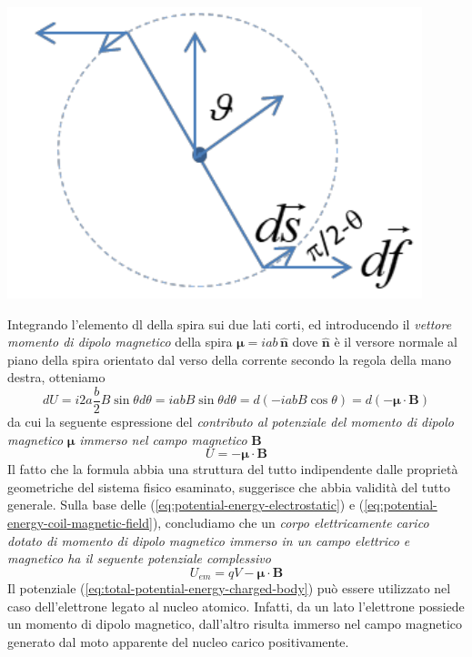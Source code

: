 \begin{marginfigure}
	\includegraphics{figs/rectangular-coil-angle}
	\label{fig:rectangular-coil-angle}
\end{marginfigure}
Integrando l’elemento dl della spira sui due lati corti, ed introducendo il \emph{vettore momento di dipolo magnetico} della spira $\bm{\mu} = i ab \, \hat{\bm{n}}$ dove $\hat{\bm{n}}$ è il versore normale al piano della spira orientato dal verso della corrente secondo la regola della mano destra, otteniamo
\[
dU = i 2a \frac{b}{2} B \sin \theta d \theta = i a bB \sin \theta d \theta =
d(-iabB \cos \theta) = d (-\bm{\mu} \cdot \bm{B})
\]
da cui la seguente espressione del \emph{contributo al potenziale del momento di  dipolo magnetico} $\bm{\mu}$ \emph{immerso nel campo magnetico} $\bm{B}$
\begin{equation}
	U = - \bm{\mu} \cdot \bm{B}
	\label{eq:potential-energy-coil-magnetic-field}
\end{equation}
Il fatto che la formula abbia una struttura del tutto indipendente dalle proprietà geometriche del sistema fisico esaminato, suggerisce che abbia validità del tutto generale.
Sulla base delle (\ref{eq:potential-energy-electrostatic}) e (\ref{eq:potential-energy-coil-magnetic-field}), concludiamo che un \emph{corpo elettricamente carico dotato di momento di dipolo magnetico immerso in un campo elettrico e magnetico ha il seguente potenziale complessivo}
\begin{equation}
	U_{em} = qV - \bm{\mu} \cdot \bm{B}
	\label{eq:total-potential-energy-charged-body}
\end{equation}
Il potenziale (\ref{eq:total-potential-energy-charged-body}) può essere utilizzato nel caso dell’elettrone legato al nucleo atomico. Infatti, da un lato l’elettrone possiede un momento di dipolo magnetico, dall’altro risulta immerso nel campo magnetico generato dal moto apparente del nucleo carico positivamente.
\bigskip

